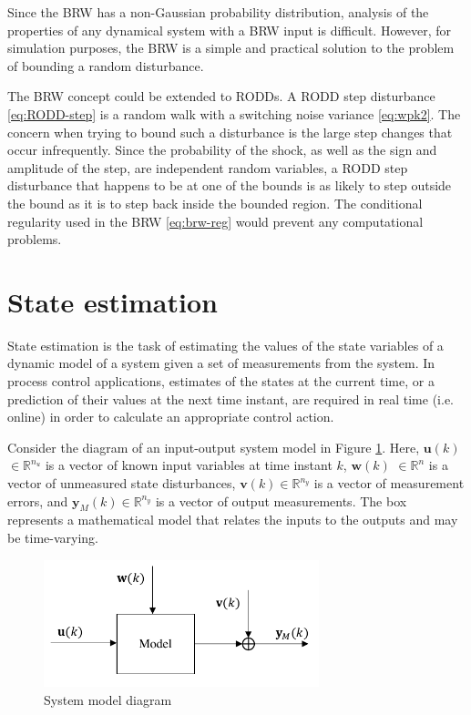 {Since the \gls{BRW} has a non-Gaussian probability distribution, analysis of the properties of any dynamical system with a \gls{BRW} input is difficult. However, for simulation purposes, the \gls{BRW} is a simple and practical solution to the problem of bounding a random disturbance.

The \gls{BRW} concept could be extended to \gls{RODD}s. A \gls{RODD} step disturbance \eqref{eq:RODD-step} is a random walk with a switching noise variance \eqref{eq:wpk2}. The concern when trying to bound such a disturbance is the large step changes that occur infrequently. Since the probability of the shock, as well as the sign and amplitude of the step, are independent random variables, a \gls{RODD} step disturbance that happens to be at one of the bounds is as likely to step outside the bound as it is to step back inside the bounded region. The conditional regularity used in the \gls{BRW} \eqref{eq:brw-reg} would prevent any computational problems.


\section{State estimation} \label{sec:estimation}

State estimation is the task of estimating the values of the state variables of a dynamic model of a system given a set of measurements from the system. In process control applications, estimates of the states at the current time, or a prediction of their values at the next time instant, are required in real time (i.e. online) in order to calculate an appropriate control action.

Consider the diagram of an input-output system model in Figure \ref{fig:model_diag_uwvy}. Here, $\mathbf{u}(k)$ $\in \mathbb{R}^{n_u}$ is a vector of known input variables at time instant $k$, $\mathbf{w}(k)$ $\in \mathbb{R}^n$ is a vector of unmeasured state disturbances, $\mathbf{v}(k) \in \mathbb{R}^{n_y}$ is a vector of measurement errors, and $\mathbf{y}_M(k) \in \mathbb{R}^{n_y}$ is a vector of output measurements. The box represents a mathematical model that relates the inputs to the outputs and may be time-varying.
%
%
%
%
\begin{figure}[ht]
	\centering
	\includegraphics[width=8cm]{images/model_diag_uwvy.pdf}
	\caption{System model diagram}
	\label{fig:model_diag_uwvy}
\end{figure}

}
